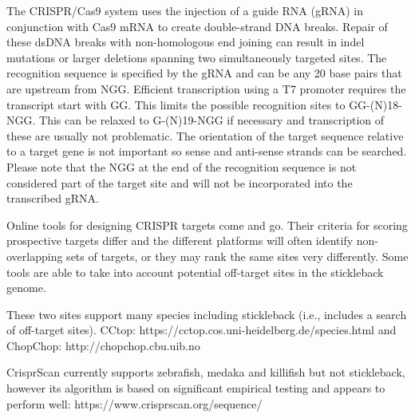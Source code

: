 \documentclass[
  letterpaper,
  DIV=11,
  numbers=noendperiod]{scrreprt}
\begin{document}
\begin{tcolorbox}[enhanced jigsaw, rightrule=.15mm, title=\textcolor{quarto-callout-note-color}{\faInfo}\hspace{0.5em}{Note}, titlerule=0mm, opacitybacktitle=0.6, toprule=.15mm, bottomrule=.15mm, opacityback=0, left=2mm, colframe=quarto-callout-note-color-frame, breakable, coltitle=black, colback=white, colbacktitle=quarto-callout-note-color!10!white, bottomtitle=1mm, leftrule=.75mm, toptitle=1mm, arc=.35mm]

The CRISPR/Cas9 system uses the injection of a guide RNA (gRNA) in
conjunction with Cas9 mRNA to create double-strand DNA breaks. Repair of
these dsDNA breaks with non-homologous end joining can result in indel
mutations or larger deletions spanning two simultaneously targeted
sites. The recognition sequence is specified by the gRNA and can be any
20 base pairs that are upstream from NGG. Efficient transcription using
a T7 promoter requires the transcript start with GG. This limits the
possible recognition sites to GG-(N)18-NGG. This can be relaxed to
G-(N)19-NGG if necessary and transcription of these are usually not
problematic. The orientation of the target sequence relative to a target
gene is not important so sense and anti-sense strands can be searched.
Please note that the NGG at the end of the recognition sequence is not
considered part of the target site and will not be incorporated into the
transcribed gRNA.

Online tools for designing CRISPR targets come and go. Their criteria
for scoring prospective targets differ and the different platforms will
often identify non-overlapping sets of targets, or they may rank the
same sites very differently. Some tools are able to take into account
potential off-target sites in the stickleback genome.

These two sites support many species including stickleback (i.e.,
includes a search of off-target sites). CCtop:
https://cctop.cos.uni-heidelberg.de/species.html and ChopChop:
http://chopchop.cbu.uib.no

CrisprScan currently supports zebrafish, medaka and killifish but not
stickleback, however its algorithm is based on significant empirical
testing and appears to perform well:
https://www.crisprscan.org/sequence/

\end{tcolorbox}
\end{document}
